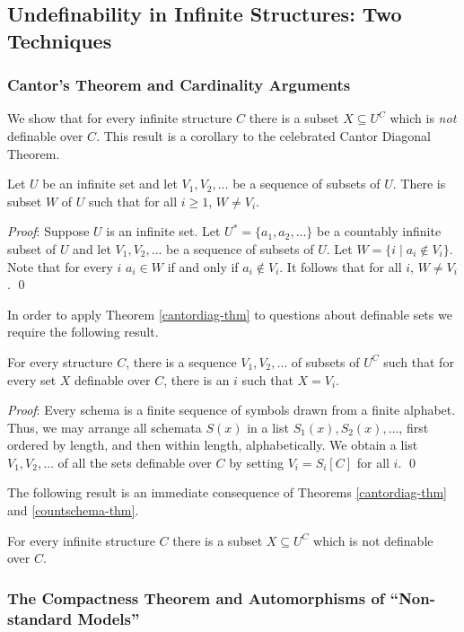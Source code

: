 \subsection{Undefinability in Infinite Structures: Two Techniques}
\subsubsection{Cantor's Theorem and Cardinality Arguments}

We show that for every infinite structure $C$ there is a subset $X\subseteq U^C$ which is \emph{not} definable over $C$. This result is a corollary to the celebrated Cantor Diagonal Theorem.
\begin{theorem}[Cantor]\label{cantordiag-thm}
Let $U$ be an infinite set and let $V_1, V_2, \ldots$ be a sequence of subsets of $U$. There is subset $W$ of $U$ such that for all $i\geq 1$, $W\neq V_i$.
\end{theorem}
\emph{Proof}: Suppose $U$ is an infinite set. Let $U^*= \{a_1, a_2, \ldots\}$ be a countably infinite subset of $U$ and let $V_1, V_2, \ldots$ be a sequence of subsets of $U$. Let $W=\{i\mid a_i\not\in V_i\}$. Note that for every $i$ $a_i\in W$ if and only if $a_i\not\in V_i$. It follows that for all $i$, $W\neq V_i$. \qed

In order to apply Theorem \ref{cantordiag-thm} to questions about definable sets we require the following result.
\begin{theorem}\label{countschema-thm}
For every structure $C$, there is a sequence $V_1,V_2,\ldots$ of subsets of $U^C$ such that for every set $X$ definable over $C$, there is an $i$ such that $X=V_i$. 
\end{theorem}
\emph{Proof}: Every schema is a finite sequence of symbols drawn from a finite alphabet. Thus, we may arrange all schemata $S(x)$ in a list $S_1(x), S_2(x),\ldots$, first ordered by length, and then within length, alphabetically. We obtain a list $V_1,V_2,\ldots $ of all the sets definable over $C$ by setting $V_i=S_i[C]$ for all $i$. \qed

The following result is an immediate consequence of  Theorems \ref{cantordiag-thm} and \ref{countschema-thm}.
\begin{corollary}
For every infinite structure $C$ there is a subset $X\subseteq U^C$ which is not definable over $C$.
\end{corollary}
\subsubsection{The Compactness Theorem and Automorphisms of ``Non-standard Models''}


